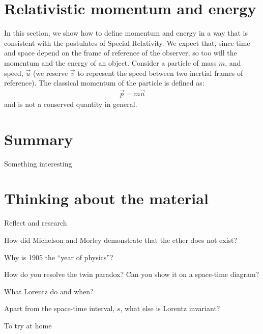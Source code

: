 \section{Relativistic momentum and energy}
In this section, we show how to define momentum and energy in a way that is consistent with the postulates of Special Relativity. We expect that, since time and space depend on the frame of reference of the observer, so too will the momentum and the energy of an object. Consider a particle of mass $m$, and speed, $\vec u$ (we reserve $\vec v$ to represent the speed between two inertial frames of reference). The classical momentum of the particle is defined as:
\begin{align*}
\vec p = m\vec u
\end{align*}
and is not a conserved quantity in general.




\newpage
\section{Summary}
\vspace{2cm}
\begin{chapterSummary}
\item Something interesting
\end{chapterSummary}


\newpage
\section{Thinking about the material}

\begin{chapteractivity}{Reflect and research}
	{
	\item How did Michelson and Morley demonstrate that the ether does not exist? 
	\item Why is 1905 the ``year of physics''?
	\item How do you resolve the twin paradox? Can you show it on a space-time diagram?
	\item What Lorentz do and when?
	\item Apart from the space-time interval, $s$, what else is Lorentz invariant?
	}
\end{chapteractivity}

\begin{chapteractivity}{To try at home}
	{
		\item 
	}
\end{chapteractivity}

